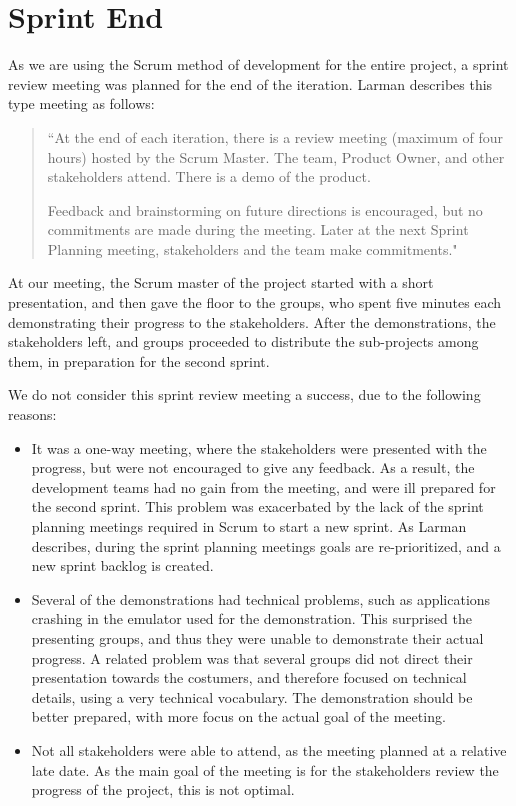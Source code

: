 \section{Sprint End}
As we are using the Scrum method of development for the entire \giraf project, a sprint review meeting was planned for the end of the iteration. 
Larman \cite[p. 71]{larmanAgile} describes this type meeting as follows:
\begin{quote}
``At the end of each iteration, there is a review meeting (maximum of four hours)
hosted by the Scrum Master.
The team, Product Owner, and other stakeholders attend.
There is a demo of the product.

Feedback and brainstorming on future directions is encouraged, but no commitments are made during the meeting.
Later at the next Sprint Planning meeting, stakeholders and the team make commitments."
\end{quote}

At our meeting, the Scrum master of the \giraf project started with a short presentation, and then gave the floor to the groups, who spent five minutes each demonstrating their progress to the stakeholders. 
After the demonstrations, the stakeholders left, and groups proceeded to distribute the sub-projects among them, in preparation for the second sprint.

We do not consider this sprint review meeting a success, due to the following reasons:
\begin{itemize}
	\item It was a one-way meeting, where the stakeholders were presented with the progress, but were not encouraged to give any feedback. As a result, the development teams had no gain from the meeting, and were ill prepared for the second sprint. This problem was exacerbated by the lack of the sprint planning meetings required in Scrum to start a new sprint. As Larman \cite[p. 70]{larmanAgile} describes, during the sprint planning meetings goals are re-prioritized, and a new sprint backlog is created. 
	\item Several of the demonstrations had technical problems, such as applications crashing in the emulator used for the demonstration. This surprised the presenting groups, and thus they were unable to demonstrate their actual progress. A related problem was that several groups did not direct their presentation towards the costumers, and therefore focused on technical details, using a very technical vocabulary. The demonstration should be better prepared, with more focus on the actual goal of the meeting.
	\item Not all stakeholders were able to attend, as the meeting planned at a relative late date. As the main goal of the meeting is for the stakeholders review the progress of the project, this is not optimal.
\end{itemize}

